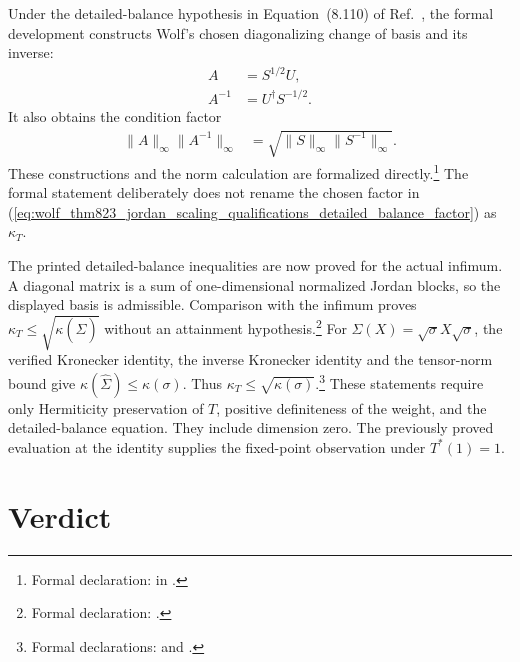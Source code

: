 \documentclass{article}
\begin{document}
Under the detailed-balance hypothesis in Equation~(8.110) of
Ref.~\cite{Wolf2012Quantum}, the formal development constructs Wolf's chosen
diagonalizing change of basis and its inverse:
\begin{align}
    A
        &= S^{1/2}U,
    \label{eq:wolf_thm823_jordan_scaling_qualifications_detailed_balance_basis}\\
    A^{-1}
        &= U^\dagger S^{-1/2}.
    \label{eq:wolf_thm823_jordan_scaling_qualifications_detailed_balance_inverse}
\end{align}
It also obtains the condition factor
\begin{align}
    \lVert A\rVert_\infty\lVert A^{-1}\rVert_\infty
        &=
        \sqrt{\lVert S\rVert_\infty
              \lVert S^{-1}\rVert_\infty}.
    \label{eq:wolf_thm823_jordan_scaling_qualifications_detailed_balance_factor}
\end{align}
These constructions and the norm calculation are formalized
directly.\footnote{Formal declaration:
in .}
The formal statement deliberately does not rename the chosen factor in
(\ref{eq:wolf_thm823_jordan_scaling_qualifications_detailed_balance_factor})
as $\kappa_T$.

The printed detailed-balance inequalities are now proved for the actual
infimum. A diagonal matrix is a sum of one-dimensional normalized Jordan
blocks, so the displayed basis is admissible. Comparison with the infimum
proves $\kappa_T\le\sqrt{\kappa(\widehat\Sigma)}$ without an attainment
hypothesis.\footnote{Formal declaration:
.}
For $\Sigma(X)=\sqrt\sigma X\sqrt\sigma$, the verified Kronecker identity,
the inverse Kronecker identity and the tensor-norm bound give
$\kappa(\widehat\Sigma)\le\kappa(\sigma)$. Thus
$\kappa_T\le\sqrt{\kappa(\sigma)}$.\footnote{Formal declarations:
 and
.}
These statements require only Hermiticity preservation of $T$, positive
definiteness of the weight, and the detailed-balance equation. They include
dimension zero. The previously proved evaluation at the identity supplies
the fixed-point observation under $T^*(1)=1$.

\section{Verdict}
\end{document}
